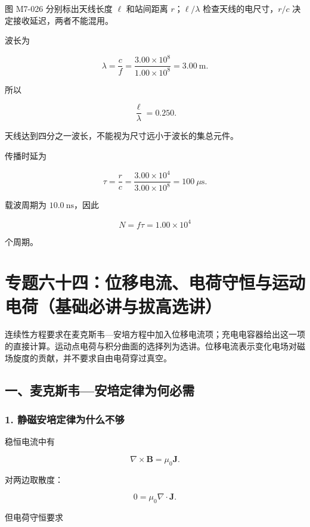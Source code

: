 图 M7-026 分别标出天线长度 \(\ell\) 和站间距离 \(r\)；\(\ell/\lambda\)
检查天线的电尺寸，\(r/c\) 决定接收延迟，两者不能混用。

波长为

\[
\boxed{\lambda=\frac c f=\frac{3.00\times10^8}{1.00\times10^8}=3.00\ \mathrm m}.
\]

所以

\[
\boxed{\frac{\ell}{\lambda}=0.250}.
\]

天线达到四分之一波长，不能视为尺寸远小于波长的集总元件。

传播时延为

\[
\boxed{\tau=\frac rc=\frac{3.00\times10^4}{3.00\times10^8}=100\ \mu\mathrm s}.
\]

载波周期为 \(10.0\ \mathrm{ns}\)，因此

\[
\boxed{N=f\tau=1.00\times10^4}
\]

个周期。

\section{专题六十四：位移电流、电荷守恒与运动电荷（基础必讲与拔高选讲）}\label{m7:ux4e13ux9898ux516dux5341ux56dbux4f4dux79fbux7535ux6d41ux7535ux8377ux5b88ux6052ux4e0eux8fd0ux52a8ux7535ux8377ux57faux7840ux5fc5ux8bb2ux4e0eux62d4ux9ad8ux9009ux8bb2}

连续性方程要求在麦克斯韦---安培方程中加入位移电流项；充电电容器给出这一项的直接计算。运动点电荷与积分曲面的选择列为选讲。位移电流表示变化电场对磁场旋度的贡献，并不要求自由电荷穿过真空。

\subsection{一、麦克斯韦---安培定律为何必需}\label{m7:ux4e00ux9ea6ux514bux65afux97e6ux5b89ux57f9ux5b9aux5f8bux4e3aux4f55ux5fc5ux9700}

\subsubsection{1.
静磁安培定律为什么不够}\label{m7:ux9759ux78c1ux5b89ux57f9ux5b9aux5f8bux4e3aux4ec0ux4e48ux4e0dux591f}

稳恒电流中有

\[
\nabla\times\mathbf B=\mu_0\mathbf J.
\]

对两边取散度：

\[
0=\mu_0\nabla\cdot\mathbf J.
\]

但电荷守恒要求

